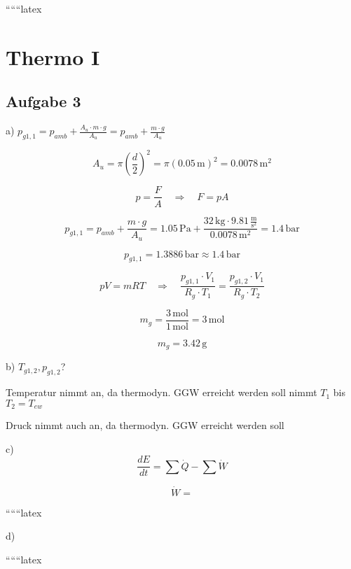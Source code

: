 
``````latex


\section*{Thermo I}
\subsection*{Aufgabe 3}

a) $p_{g1,1} = p_{amb} + \frac{A_u \cdot m \cdot g}{A_u} = p_{amb} + \frac{m \cdot g}{A_u}$

\[
A_u = \pi \left(\frac{d}{2}\right)^2 = \pi \left(0.05 \, \text{m}\right)^2 = 0.0078 \, \text{m}^2
\]

\[
p = \frac{F}{A} \quad \Rightarrow \quad F = pA
\]

\[
p_{g1,1} = p_{amb} + \frac{m \cdot g}{A_u} = 1.05 \, \text{Pa} + \frac{32 \, \text{kg} \cdot 9.81 \, \frac{\text{m}}{\text{s}^2}}{0.0078 \, \text{m}^2} = 1.4 \, \text{bar}
\]

\[
p_{g1,1} = 1.3886 \, \text{bar} \approx 1.4 \, \text{bar}
\]

\[
pV = mRT \quad \Rightarrow \quad \frac{p_{g1,1} \cdot V_1}{R_g \cdot T_1} = \frac{p_{g1,2} \cdot V_1}{R_g \cdot T_2}
\]

\[
m_g = \frac{3 \, \text{mol}}{1 \, \text{mol}} = 3 \, \text{mol}
\]

\[
m_g = 3.42 \, \text{g}
\]

b) $T_{g1,2}, p_{g1,2}$?

Temperatur nimmt an, da thermodyn. GGW erreicht werden soll nimmt $T_1$ bis $T_2 = T_{ew}$

Druck nimmt auch an, da thermodyn. GGW erreicht werden soll

c) 
\[
\frac{dE}{dt} = \sum \dot{Q} - \sum \dot{W}
\]

\[
\dot{W} = 
\]

``````latex


d)

``````latex


